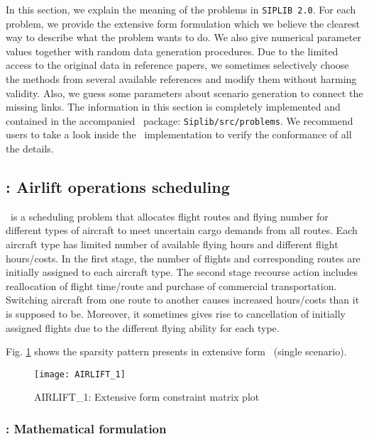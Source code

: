 In this section, we explain the meaning of the problems in \texttt{SIPLIB 2.0}. For each problem, we provide the extensive form formulation which we believe the clearest way to describe what the problem wants to do. We also give numerical parameter values together with random data generation procedures. Due to the limited access to the original data in reference papers, we sometimes selectively choose the methods from several available references and modify them without harming validity. Also, we guess some parameters about scenario generation to connect the missing links. The information in this section is completely implemented and contained in the accompanied \julia\ package: \texttt{Siplib/src/problems}. We recommend users to take a look inside the \julia\ implementation to verify the conformance of all the details.
\subsection{\airlift: Airlift operations scheduling} \label{AIRLIFT}
\airlift\ is a scheduling problem that allocates flight routes and flying number for different types of aircraft to meet uncertain cargo demands from all routes. Each aircraft type has limited number of available flying hours and different flight hours/costs. In the first stage, the number of flights and corresponding routes are initially assigned to each aircraft type. The second stage recourse action includes reallocation of flight time/route and purchase of commercial transportation. Switching aircraft from one route to another causes increased hours/costs than it is supposed to be. Moreover, it sometimes gives rise to cancellation of initially assigned flights due to the different flying ability for each type.    

Fig. \ref{fig:airlift_sparsity} shows the sparsity pattern presents in extensive form \airlift\ (single scenario).
\begin{figure}[H]
	\centering
	\texttt{[image: AIRLIFT\_1]}
	\caption{AIRLIFT\_1: Extensive form constraint matrix plot}
	\label{fig:airlift_sparsity}
\end{figure}
\subsubsection{\airlift: Mathematical formulation}

